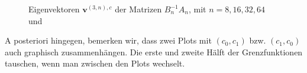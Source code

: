\begin{figure}[H]
  \centering
  \hspace{0mm}
  \hspace{0mm}
  \caption{Eigenvektoren $\mathbf{v}^{(3, n), c}$ der Matrizen $B_n^{-1} A_n$, mit $n = 8, 16, 32, 64$ und}
  \label{fig:Eigenvektoren_general_Vielfache}
\end{figure}

A posteriori hingegen, bemerken wir, dass zwei Plots mit $(c_0, c_1)$ bzw. $(c_1, c_0)$ auch graphisch zusammenhängen. Die erste und zweite Hälft der Grenzfunktionen tauschen, wenn man zwischen den Plots wechselt. \\

